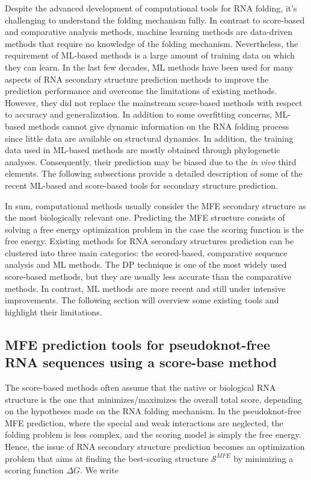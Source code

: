 Despite the advanced development of computational tools for \ac{RNA} folding, it's challenging to understand the folding mechanism fully. In contrast to score-based and comparative analysis methods, machine learning methods are data-driven methods that require no knowledge of the folding mechanism. Nevertheless, the requirement of \ac{ML}-based methods is a large amount of training data on which they can learn. In the last few decades, \ac{ML} methods have been used for many aspects of \ac{RNA} secondary structure prediction methods to improve the prediction performance and overcome the limitations of existing methods. However, they did not replace the mainstream score-based methods with respect to accuracy and generalization. In addition to some overfitting concerns, \ac{ML}-based methods cannot give dynamic information on the \ac{RNA} folding process since little data are available on structural dynamics. In addition, the training data used in \ac{ML}-based methods are mostly obtained through phylogenetic analyses. Consequently, their prediction may be biased due to the \textit{in vivo} third elements. The following subsections provide a detailed description of some of the recent \ac{ML}-based and score-based tools for secondary structure prediction.

In sum, computational methods usually consider the \ac{MFE} secondary structure as the most biologically relevant one. Predicting the \ac{MFE} structure consists of solving a free energy optimization problem in the case the scoring function is the free energy. Existing methods for RNA secondary structures prediction can be clustered into three main categories: the scored-based, comparative sequence analysis and \ac{ML} methods. The \ac{DP} technique is one of the most widely used score-based methods, but they are usually less accurate than the comparative methods. In contrast, \ac{ML} methods are more recent and still under intensive improvements. The following section will overview some existing tools and highlight their limitations. 

\subsection{ MFE prediction tools for pseudoknot-free \ac{RNA} sequences using a score-base method}
The score-based methods often assume that the native or biological \ac{RNA} structure is the one that minimizes/maximizes the overall total score, depending on the hypotheses made on the \ac{RNA} folding mechanism. In the pseudoknot-free \ac{MFE} prediction, where the special and weak interactions are neglected, the folding problem is less complex, and the scoring model is simply the free energy. Hence, the issue of \ac{RNA} secondary structure prediction becomes an optimization problem that aims at finding the best-scoring structure $\mathcal{S}^{MFE}$ by minimizing a scoring function $\Delta G$. We write

